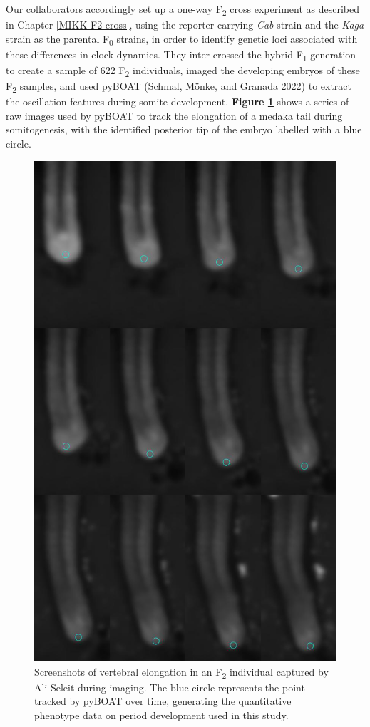 \documentclass[
]{book}
\begin{document}
Our collaborators accordingly set up a one-way F\textsubscript{2} cross experiment as described in Chapter \ref{MIKK-F2-cross}, using the reporter-carrying \emph{Cab} strain and the \emph{Kaga} strain as the parental F\textsubscript{0} strains, in order to identify genetic loci associated with these differences in clock dynamics. They inter-crossed the hybrid F\textsubscript{1} generation to create a sample of 622 F\textsubscript{2} individuals, imaged the developing embryos of these F\textsubscript{2} samples, and used pyBOAT (Schmal, Mönke, and Granada 2022) to extract the oscillation features during somite development. \textbf{Figure \ref{fig:somite-period-ali}} shows a series of raw images used by pyBOAT to track the elongation of a medaka tail during somitogenesis, with the identified posterior tip of the embryo labelled with a blue circle.



\begin{figure}

{\centering \includegraphics[width=0.8\linewidth]{figs/somites/ali_compiled_somite_elong} 

}

\caption{Screenshots of vertebral elongation in an F\textsubscript{2} individual captured by Ali Seleit during imaging. The blue circle represents the point tracked by pyBOAT over time, generating the quantitative phenotype data on period development used in this study.}\label{fig:somite-period-ali}
\end{figure}
\end{document}
